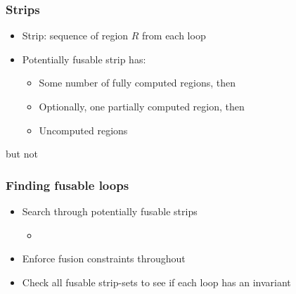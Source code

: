 \documentclass{beamer}
\begin{document}
\begin{frame}
  \frametitle{Strips}
  \begin{itemize}
  \item Strip: sequence of region $R$ from each loop
  \item Potentially fusable strip has:
    \begin{itemize}
    \item Some number of fully computed regions, then
    \item Optionally, one partially computed region, then
    \item Uncomputed regions
    \end{itemize}
  \end{itemize}


  but not

\end{frame}

\begin{frame}
  \frametitle{Finding fusable loops}
  \begin{itemize}
  \item Search through potentially fusable strips
    \begin{itemize}
    \item
    \end{itemize}
  \item Enforce fusion constraints throughout
  \item Check all fusable strip-sets to see if each loop has an invariant
  \end{itemize}
\end{frame}
\end{document}
